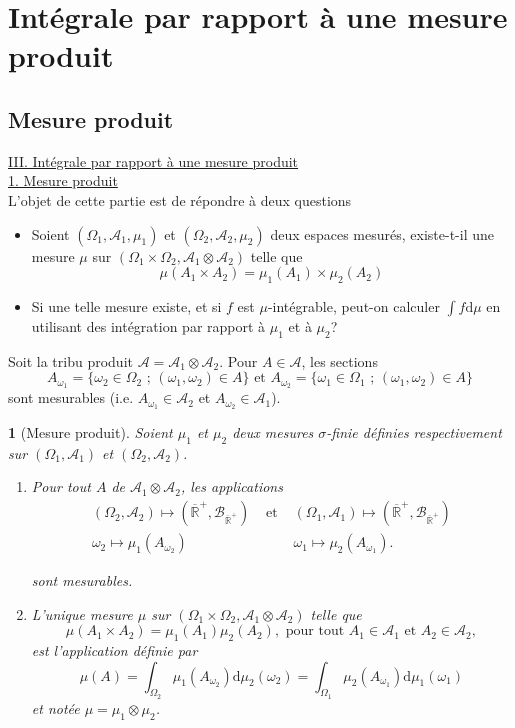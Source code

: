 \documentclass[8pt,notheorems]{beamer}
\def \R{\mathbb{R}}
\def \Om{\Omega}
\def \om{\omega}
\newtheorem{theorem}{\translate{Theorem}}[section]
\newtheorem{theorem}{\translate{Theoreme}}
\theoremstyle{definition}
\theoremstyle{example}
\theoremstyle{mystyle}
\theoremstyle{plain}
\begin{document}
\section{Intégrale par rapport à une mesure produit}
\subsection{Mesure produit}
\begin{frame}[allowframebreaks]

\underline{III. Intégrale par rapport à une mesure produit }\\
\underline{1. Mesure produit}\\
L'objet de cette partie est de répondre à deux questions
\begin{itemize}
    \item Soient $(\Om_1,\mathcal{A}_1, \mu_1)$ et $(\Om_2,\mathcal{A}_2, \mu_2)$ deux espaces mesurés, existe-t-il une mesure $\mu$ sur $(\Omega_1\times \Omega_2,\mathcal{A}_1\otimes \mathcal{A}_2)$ telle que 
    $$
    \mu(A_1\times A_2)=\mu_1(A_1)\times \mu_2(A_2)
    $$
    \item Si une telle mesure existe, et si $f$ est $\mu$-intégrable, peut-on calculer $\int f\text{d}\mu$ en utilisant des intégration par rapport à $\mu_1$ et à $\mu_2$?
\end{itemize}
Soit la tribu produit $\mathcal{A}=\mathcal{A}_1\otimes\mathcal{A}_2$. Pour $A\in\mathcal{A}$, les sections
$$
A_{\om_1}=\{\om_2\in\Om_2\text{ ; }(\om_1,\om_2)\in A\}\text{ et }A_{\om_2}=\{\om_1\in\Om_1\text{ ; }(\om_1,\om_2)\in A\}
$$
sont mesurables (i.e. $A_{\om_1}\in\mathcal{A}_2$ et $A_{\om_2}\in\mathcal{A}_1$).
\begin{theorem}[Mesure produit]
Soient $\mu_1$ et $\mu_2$ deux mesures $\sigma$-finie définies respectivement sur $(\Om_1,\mathcal{A}_1)$ et $(\Om_2,\mathcal{A}_2)$.
\begin{enumerate}
    \item Pour tout $A$ de $\mathcal{A}_1\otimes \mathcal{A}_2$, les applications
    \begin{eqnarray*}
    (\Omega_2,\mathcal{A}_2)\mapsto \left(\overline{\R}^{+},\mathcal{B}_{\overline{\R}^{+}}\right)&\text{ et }&(\Omega_1,\mathcal{A}_1)\mapsto \left(\overline{\R}^{+},\mathcal{B}_{\overline{\R}^{+}}\right) \\
    \omega_2\mapsto \mu_{1}(A_{\omega_2}) && \omega_1\mapsto \mu_{2}(A_{\omega_1}).
    \end{eqnarray*}

 sont mesurables. 
    \item L'unique mesure $\mu$ sur $(\Om_1\times\Om_2,\mathcal{A}_1\otimes\mathcal{A}_2)$ telle que
$$
\mu(A_1\times A_2)=\mu_1(A_1)\mu_2(A_2),\text{ pour tout }A_1\in\mathcal{A}_1\text{ et }A_2\in\mathcal{A}_2,
$$
est l'application définie par 
$$
\mu(A) = \int_{\Omega_2}\mu_1(A_{\omega_2})\text{d}\mu_2(\omega_2) =\int_{\Omega_1}\mu_2(A_{\omega_1})\text{d}\mu_1(\omega_1) 
$$
et notée $\mu = \mu_1\otimes\mu_2$.
\end{enumerate}
 

\end{theorem}
\end{frame}
\end{document}
